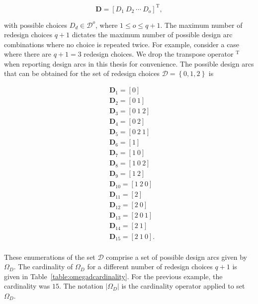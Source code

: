 \begin{equation} \label{eq:designarc}
	\mathbf{D} = \left[D_1 ~ D_2 ~ \cdots ~ D_o\right]^{\mathrm{T}},
\end{equation}

with possible choices $D_d \in \mathcal{D}^o$, where $1 \leq o \leq q+1$. The maximum number of redesign choices $q + 1$ dictates the maximum number of possible design arc combinations where no choice is repeated twice. For example, consider a case where there are $q + 1 = 3$ redesign choices. We drop the transpose operator $^{\mathrm{T}}$ when reporting design arcs in this thesis for convenience. The possible design arcs that can be obtained for the set of redesign choices $\mathcal{D} = \left\{0,1,2\right\}$ is

\begin{equation*}
	\begin{aligned}
		& \mathbf{D}_1 = \left[0\right]\\
		& \mathbf{D}_2 = \left[0 ~ 1\right]\\
		& \mathbf{D}_3 = \left[0 ~ 1 ~ 2\right]\\
		& \mathbf{D}_4 = \left[0 ~ 2\right]\\
		& \mathbf{D}_5 = \left[0 ~ 2 ~ 1\right]\\
		& \mathbf{D}_6 = \left[1\right]\\
		& \mathbf{D}_7 = \left[1 ~ 0\right]\\
		& \mathbf{D}_8 = \left[1 ~ 0 ~ 2\right]\\
		& \mathbf{D}_9 = \left[1 ~ 2\right]\\
		& \mathbf{D}_{10} = \left[1 ~ 2 ~ 0\right]\\
		& \mathbf{D}_{11} = \left[2\right]\\
		& \mathbf{D}_{12} = \left[2 ~ 0\right]\\
		& \mathbf{D}_{13} = \left[2 ~ 0 ~ 1\right]\\
		& \mathbf{D}_{14} = \left[2 ~ 1\right]\\
		& \mathbf{D}_{15} = \left[2 ~ 1 ~ 0\right].\\
	\end{aligned}
\end{equation*}

These enumerations of the set $\mathcal{D}$ comprise a set of possible design arcs given by $\Omega_D$. The cardinality of $\Omega_D$ for a different number of redesign choices $q+1$ is given in Table~\ref{table:omegadcardinality}. For the previous example, the cardinality was $15$. The notation $|\Omega_D|$ is the cardinality operator applied to set $\Omega_D$.

